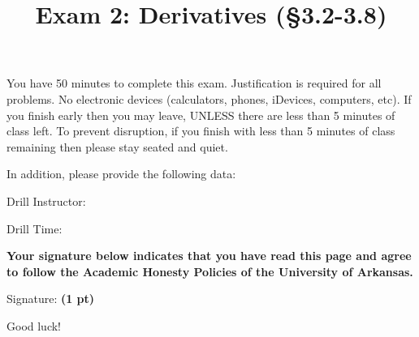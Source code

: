 \documentclass[12pt]{article}
\title{\vspace{-8pc}
\vfill{\Huge
	\bf Exam 2: Derivatives (\S 3.2-3.8)} 
	}
\author{}
\date{}
\begin{document}
\maketitle
\vspace{-3pc}
 You have 50 minutes to complete this exam.  Justification is required for all problems.  No electronic devices (calculators, phones, iDevices, computers, etc).  If you finish early then you may leave, UNLESS there are less than 5 minutes of class left.  To prevent disruption, if you finish with less than 5 minutes of class remaining then please stay seated and quiet.

\begin{flushright}
In addition, please provide the following data:

\vspace{1.5pc}
Drill Instructor: \underline{\hspace{40ex}}

\vspace{1.5pc}
Drill Time: \underline{\hspace{40ex}}
\end{flushright}

\vfill
\noindent\textbf{Your signature below indicates that you have read this page and agree to follow the Academic Honesty Policies of the University of Arkansas.}  

\vspace{2pc}
\noindent Signature: {\bf (1 pt)} \underline{\hspace{73ex}}

\begin{flushright}\Large Good luck!\end{flushright}
\end{document}

